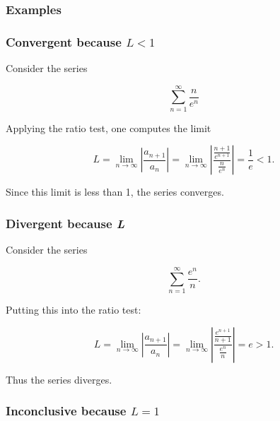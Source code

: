 \subsubsection{Examples}
\label{sss:exam-bfeb}


\subsubsection{Convergent because $L < 1$}
\label{sss:conv-9602}


Consider the series


\[
\sum _{n=1}^\infty\frac{n}{e^n}
\]


Applying the ratio test, one computes the limit


\[
L = \lim _{n\to\infty} \left| \frac{a _{n+1}}{a_n} \right| = \lim _{n\to\infty} \left| \frac{\frac{n+1}{e^{n+1}}}{\frac{n}{e^n}}\right| = \frac{1}{e} < 1.
\]


Since this limit is less than 1, the series converges.


\subsubsection{Divergent because \textit{L}
\label{sss:dive-77ed}
 }


Consider the series


\[
\sum _{n=1}^\infty\frac{e^n}{n}.
\]


Putting this into the ratio test:


\[
L = \lim _{n\to\infty} \left| \frac{a _{n+1}}{a_n} \right| = \lim _{n\to\infty} \left| \frac{\frac{e^{n+1}}{n+1}}{\frac{e^n}{n}} \right|

= e > 1.
\]


Thus the series diverges.


\subsubsection{Inconclusive because $L = 1$}
\label{sss:inco-32dd}


